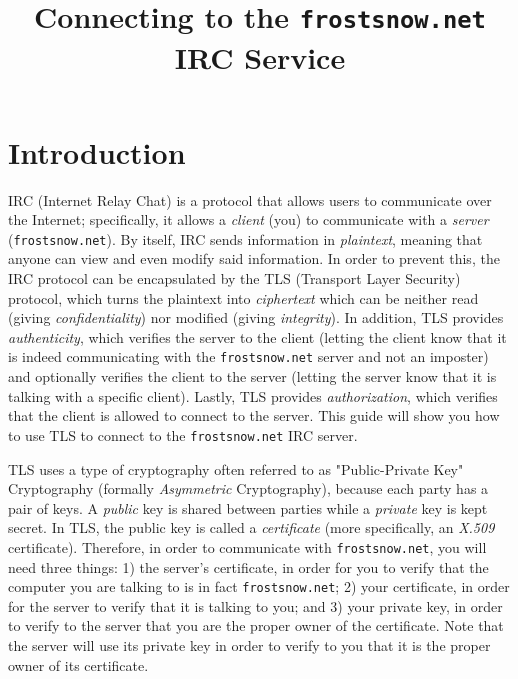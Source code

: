 \documentclass{article}
\begin{document}
\title{Connecting to the \texttt{frostsnow.net} IRC Service}

\maketitle

\section{Introduction}
IRC (Internet Relay Chat) is a protocol that allows users to communicate over the Internet; specifically, it allows a \textit{client} (you) to communicate with a \textit{server} (\texttt{frostsnow.net}).  By itself, IRC sends information in \textit{plaintext}, meaning that anyone can view and even modify said information.  In order to prevent this, the IRC protocol can be encapsulated by the TLS (Transport Layer Security) protocol, which turns the plaintext into \textit{ciphertext} which can be neither read (giving \textit{confidentiality}) nor modified (giving \textit{integrity}).  In addition, TLS provides \textit{authenticity}, which verifies the server to the client (letting the client know that it is indeed communicating with the \texttt{frostsnow.net} server and not an imposter) and optionally verifies the client to the server (letting the server know that it is talking with a specific client).  Lastly, TLS provides \textit{authorization}, which verifies that the client is allowed to connect to the server.  This guide will show you how to use TLS to connect to the \texttt{frostsnow.net} IRC server.

TLS uses a type of cryptography often referred to as "Public-Private Key" Cryptography (formally \textit{Asymmetric} Cryptography), because each party has a pair of keys.  A \textit{public} key is shared between parties while a \textit{private} key is kept secret.  In TLS, the public key is called a \textit{certificate} (more specifically, an \textit{X.509} certificate).  Therefore, in order to communicate with \texttt{frostsnow.net}, you will need three things: 1) the server's certificate, in order for you to verify that the computer you are talking to is in fact \texttt{frostsnow.net}; 2) your certificate, in order for the server to verify that it is talking to you; and 3) your private key, in order to verify to the server that you are the proper owner of the certificate.  Note that the server will use its private key in order to verify to you that it is the proper owner of its certificate.
\end{document}
